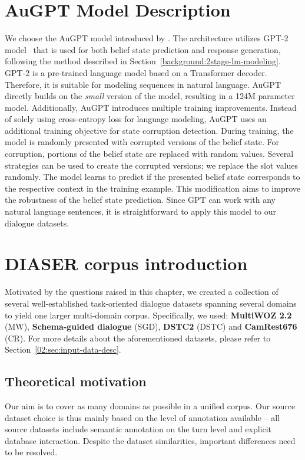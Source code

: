 \section{AuGPT Model Description}
We choose the AuGPT model introduced by \citet{kulhanek-etal-2021-augpt}.
The architecture utilizes GPT-2 model~\cite{radford2019language} that is used for both belief state prediction and response generation, following the method described in Section~\ref{background:2stage-lm-modeling}.
GPT-2 is a pre-trained language model based on a Transformer decoder.
Therefore, it is suitable for modeling sequences in natural language.
AuGPT directly builds on the \emph{small} version of the model, resulting in a 124M parameter model.
Additionally, AuGPT introduces multiple training improvements.
Instead of solely using cross-entropy loss for language modeling, AuGPT uses an additional training objective for state corruption detection.
During training, the model is randomly presented with corrupted versions of the belief state.
For corruption, portions of the belief state are replaced with random values.
Several strategies can be used to create the corrupted versions; we replace the slot values randomly.
The model learns to predict if the presented belief state corresponds to the respective context in the training example.
This modification aims to improve the robustness of the belief state prediction.
Since GPT can work with any natural language sentences, it is straightforward to apply this model to our dialogue datasets.

\section{DIASER corpus introduction}
\label{sec:diaser}
Motivated by the questions raised in this chapter, we created a collection of several well-established task-oriented dialogue datasets spanning several domains to yield one larger multi-domain corpus.
Specifically, we used: \textbf{MultiWOZ 2.2} (MW), \textbf{Schema-guided dialogue} (SGD), \textbf{DSTC2} (DSTC) and \textbf{CamRest676} (CR).
For more details about the aforementioned datasets, please refer to Section~\ref{02:sec:input-data-desc}.

\subsection{Theoretical motivation}
Our aim is to cover as many domains as possible in a unified corpus.
Our source dataset choice is thus mainly based on the level of annotation available -- all source datasets include semantic annotation on the turn level and explicit database interaction. 
Despite the dataset similarities, important differences need to be resolved.

